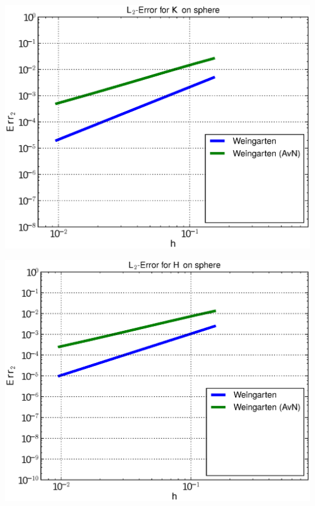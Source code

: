 \documentclass[handout]{beamer}
\begin{document}
\begin{frame}
\begin{overprint}
\begin{minipage}[t]{0.49\textwidth}
          \end{minipage}
          \begin{minipage}[t]{0.49\textwidth}
            \centering\includegraphics[width=\textwidth]{bilder/Curvature/sphere/ErrKL2_2.eps}
          \end{minipage}\hfill
          \begin{minipage}[t]{0.49\textwidth}
            \centering\includegraphics[width=\textwidth]{bilder/Curvature/sphere/ErrHL2_2.eps}
          \end{minipage}
          \begin{minipage}[t]{0.49\textwidth}

\end{minipage}
\end{overprint}
\end{frame}
\end{document}
